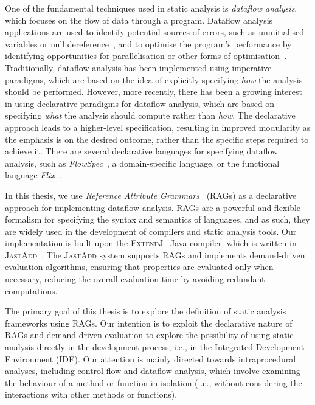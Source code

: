 One of the fundamental techniques used in static analysis is \emph{dataflow analysis},
which focuses on the flow of data through a program. Dataflow analysis applications are used to identify
potential sources of errors, such as uninitialised variables or null dereference~\cite{khedker2017data},
and to optimise the program's performance by identifying opportunities for
parallelisation or other forms of optimisation~\cite{aho2007compilers}.
Traditionally, dataflow analysis has been implemented using imperative paradigms,
which are based on the idea of explicitly specifying \emph{how} the analysis should be
performed.
However, more recently, there has been a growing interest in using
declarative paradigms for dataflow analysis, which are based on specifying \emph{what}
the analysis should compute rather than \emph{how}.
The declarative approach leads to a higher-level specification, resulting in improved modularity as
the emphasis is on the desired outcome, rather than the specific steps required to
achieve it.
There are several declarative languages for specifying dataflow analysis,
such as \emph{FlowSpec}~\cite{smits2020flowspec}, a domain-specific language,
or the functional language \emph{Flix}~\cite{madsen2016programming}.

In this thesis, we use \emph{Reference Attribute Grammars}~\cite{hedin2000rags} (RAGs)
as a declarative approach for implementing dataflow analysis. RAGs are
a powerful and flexible formalism for specifying the syntax and semantics of languages,
and as such, they are widely used in the development of compilers and static analysis tools.
Our implementation is built upon the \textsc{ExtendJ}~\cite{ekman2007jastadd} Java compiler,
which is written in \textsc{JastAdd}~\cite{DBLP:journals/entcs/HedinM01}.
The \textsc{JastAdd} system supports RAGs and implements demand-driven evaluation algorithms,
ensuring that properties are evaluated only
when necessary, reducing the overall evaluation time by avoiding redundant
computations.

The primary goal of this thesis is to explore the definition of static analysis
frameworks using RAGs.
Our intention is to exploit the declarative nature of RAGs and
demand-driven evaluation to explore the possibility of using static
analysis directly in the development process, i.e., in the Integrated Development Environment (IDE).
Our attention is mainly directed towards intraprocedural analyses,
including control-flow and dataflow analysis, which involve examining the
behaviour of a method or function in isolation (i.e., without considering the
interactions with other methods or functions).


